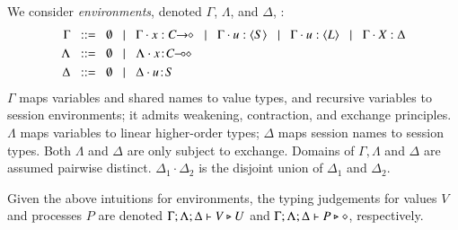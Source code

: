 \documentclass[preprint,11pt]{elsarticle}
\begin{document}
We consider 
\emph{environments}, denoted $\Gamma$, $\Lambda$, and $\Delta$, :
\begin{align*}
		\Gamma  & \bnfis  \emptyset \bnfbar \Gamma \cat \varp{x}: \shot{C} \bnfbar \Gamma \cat u: \chtype{S} \bnfbar \Gamma \cat u: \chtype{L} 
		\bnfbar \Gamma \cat \rvar{X}: \Delta
\\
		\Lambda & \bnfis  \emptyset \bnfbar \Lambda \cat \AT{x}{\lhot{C}}
		 \\
		\Delta   & \bnfis   \emptyset \bnfbar \Delta \cat \AT{u}{S}
\end{align*}
$\Gamma$ maps variables and shared names to value types, and recursive 
variables to session environments; %
it admits weakening, contraction, and exchange principles.
$\Lambda$ maps variables to 
linear
higher-order
types;   $\Delta$  maps   
session names to session types. 
Both $\Lambda$ and $\Delta$
are
only subject to exchange.  
Domains of $\Gamma,
\Lambda$ and $\Delta$ are assumed pairwise distinct. 
$\Delta_1\cdot \Delta_2$ is the disjoint union of $\Delta_1$ and $\Delta_2$.  

Given the above intuitions for environments, 
the typing judgements for values $V$ and processes $P$ are denoted 
$\Gamma; \Lambda; \Delta \vdash V \triangleright U$ and $\Gamma; \Lambda; \Delta \vdash P \triangleright \diamond$, respectively.
%
 


\end{document}
